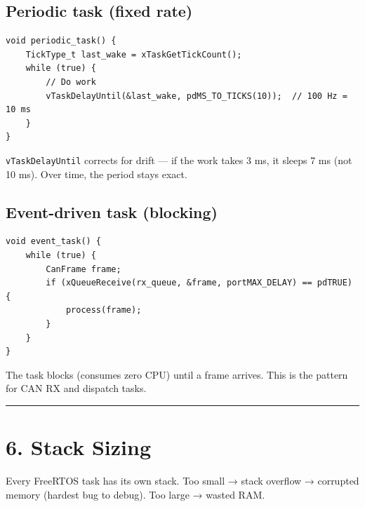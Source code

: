 \documentclass[12pt,a4paper,oneside]{report}
\begin{document}
\subsection{Periodic task (fixed rate)}\label{periodic-task-fixed-rate}

\begin{verbatim}
void periodic_task() {
    TickType_t last_wake = xTaskGetTickCount();
    while (true) {
        // Do work
        vTaskDelayUntil(&last_wake, pdMS_TO_TICKS(10));  // 100 Hz = 10 ms
    }
}
\end{verbatim}

\texttt{vTaskDelayUntil} corrects for drift --- if the work takes 3 ms, it
sleeps 7 ms (not 10 ms). Over time, the period stays exact.

\subsection{Event-driven task (blocking)}\label{event-driven-task-blocking}

\begin{verbatim}
void event_task() {
    while (true) {
        CanFrame frame;
        if (xQueueReceive(rx_queue, &frame, portMAX_DELAY) == pdTRUE) {
            process(frame);
        }
    }
}
\end{verbatim}

The task blocks (consumes zero CPU) until a frame arrives. This is the pattern
for CAN RX and dispatch tasks.

\begin{center}\rule{0.5\linewidth}{0.5pt}\end{center}

\section{6. Stack Sizing}\label{stack-sizing}

Every FreeRTOS task has its own stack. Too small → stack overflow → corrupted
memory (hardest bug to debug). Too large → wasted RAM.
\end{document}
